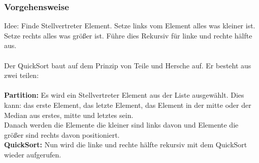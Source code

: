 \documentclass{article}
\begin{document}
\subsubsection*{Vorgehensweise}
Idee: Finde Stellvertreter Element. Setze links vom Element alles was kleiner ist. Setze rechts alles was größer ist. Führe dies Rekursiv für linke und rechte hälfte aus.\\
\\
Der QuickSort baut auf dem Prinzip von Teile und Hersche auf. Er besteht aus zwei teilen:\\ \\
\textbf{Partition:} Es wird ein Stellvertreter Element aus der Liste ausgewählt. Dies kann: das erste Element, das letzte Element, das Element in der mitte oder der Median aus erstes, mitte und letztes sein.\\ Danach werden die Elemente die kleiner sind links davon und Elemente die größer sind rechts davon positioniert.\\
\textbf{QuickSort:} Nun wird die linke und rechte hälfte rekursiv mit dem QuickSort wieder aufgerufen. %
\end{document}
